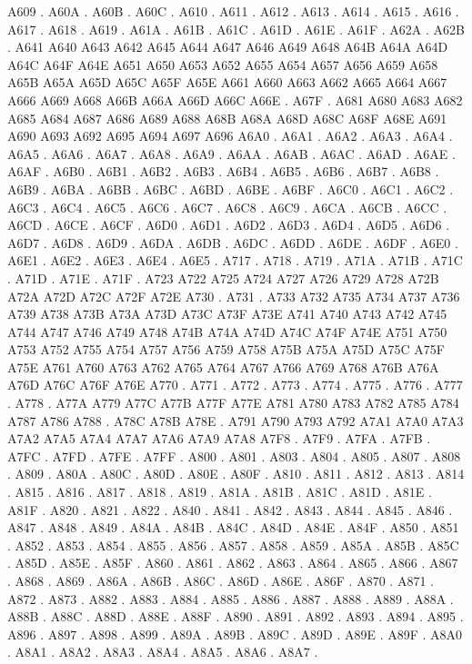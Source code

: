 A609 .
A60A .
A60B .
A60C .
A610 .
A611 .
A612 .
A613 .
A614 .
A615 .
A616 .
A617 .
A618 .
A619 .
A61A .
A61B .
A61C .
A61D .
A61E .
A61F .
A62A .
A62B .
A641 A640
A643 A642
A645 A644
A647 A646
A649 A648
A64B A64A
A64D A64C
A64F A64E
A651 A650
A653 A652
A655 A654
A657 A656
A659 A658
A65B A65A
A65D A65C
A65F A65E
A661 A660
A663 A662
A665 A664
A667 A666
A669 A668
A66B A66A
A66D A66C
A66E .
A67F .
A681 A680
A683 A682
A685 A684
A687 A686
A689 A688
A68B A68A
A68D A68C
A68F A68E
A691 A690
A693 A692
A695 A694
A697 A696
A6A0 .
A6A1 .
A6A2 .
A6A3 .
A6A4 .
A6A5 .
A6A6 .
A6A7 .
A6A8 .
A6A9 .
A6AA .
A6AB .
A6AC .
A6AD .
A6AE .
A6AF .
A6B0 .
A6B1 .
A6B2 .
A6B3 .
A6B4 .
A6B5 .
A6B6 .
A6B7 .
A6B8 .
A6B9 .
A6BA .
A6BB .
A6BC .
A6BD .
A6BE .
A6BF .
A6C0 .
A6C1 .
A6C2 .
A6C3 .
A6C4 .
A6C5 .
A6C6 .
A6C7 .
A6C8 .
A6C9 .
A6CA .
A6CB .
A6CC .
A6CD .
A6CE .
A6CF .
A6D0 .
A6D1 .
A6D2 .
A6D3 .
A6D4 .
A6D5 .
A6D6 .
A6D7 .
A6D8 .
A6D9 .
A6DA .
A6DB .
A6DC .
A6DD .
A6DE .
A6DF .
A6E0 .
A6E1 .
A6E2 .
A6E3 .
A6E4 .
A6E5 .
A717 .
A718 .
A719 .
A71A .
A71B .
A71C .
A71D .
A71E .
A71F .
A723 A722
A725 A724
A727 A726
A729 A728
A72B A72A
A72D A72C
A72F A72E
A730 .
A731 .
A733 A732
A735 A734
A737 A736
A739 A738
A73B A73A
A73D A73C
A73F A73E
A741 A740
A743 A742
A745 A744
A747 A746
A749 A748
A74B A74A
A74D A74C
A74F A74E
A751 A750
A753 A752
A755 A754
A757 A756
A759 A758
A75B A75A
A75D A75C
A75F A75E
A761 A760
A763 A762
A765 A764
A767 A766
A769 A768
A76B A76A
A76D A76C
A76F A76E
A770 .
A771 .
A772 .
A773 .
A774 .
A775 .
A776 .
A777 .
A778 .
A77A A779
A77C A77B
A77F A77E
A781 A780
A783 A782
A785 A784
A787 A786
A788 .
A78C A78B
A78E .
A791 A790
A793 A792
A7A1 A7A0
A7A3 A7A2
A7A5 A7A4
A7A7 A7A6
A7A9 A7A8
A7F8 .
A7F9 .
A7FA .
A7FB .
A7FC .
A7FD .
A7FE .
A7FF .
A800 .
A801 .
A803 .
A804 .
A805 .
A807 .
A808 .
A809 .
A80A .
A80C .
A80D .
A80E .
A80F .
A810 .
A811 .
A812 .
A813 .
A814 .
A815 .
A816 .
A817 .
A818 .
A819 .
A81A .
A81B .
A81C .
A81D .
A81E .
A81F .
A820 .
A821 .
A822 .
A840 .
A841 .
A842 .
A843 .
A844 .
A845 .
A846 .
A847 .
A848 .
A849 .
A84A .
A84B .
A84C .
A84D .
A84E .
A84F .
A850 .
A851 .
A852 .
A853 .
A854 .
A855 .
A856 .
A857 .
A858 .
A859 .
A85A .
A85B .
A85C .
A85D .
A85E .
A85F .
A860 .
A861 .
A862 .
A863 .
A864 .
A865 .
A866 .
A867 .
A868 .
A869 .
A86A .
A86B .
A86C .
A86D .
A86E .
A86F .
A870 .
A871 .
A872 .
A873 .
A882 .
A883 .
A884 .
A885 .
A886 .
A887 .
A888 .
A889 .
A88A .
A88B .
A88C .
A88D .
A88E .
A88F .
A890 .
A891 .
A892 .
A893 .
A894 .
A895 .
A896 .
A897 .
A898 .
A899 .
A89A .
A89B .
A89C .
A89D .
A89E .
A89F .
A8A0 .
A8A1 .
A8A2 .
A8A3 .
A8A4 .
A8A5 .
A8A6 .
A8A7 .
